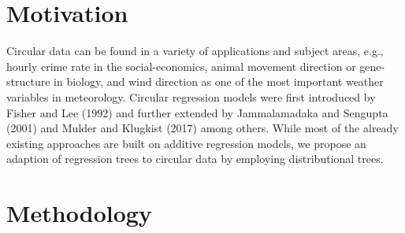 \documentclass[twoside]{report}
\begin{document}


\section{Motivation}

Circular data can be found in a variety of applications and subject areas, 
e.g., hourly crime rate in the social-economics, 
animal movement direction or gene-structure in biology, 
and wind direction as one of the most important weather variables in meteorology.
Circular regression models were first introduced by Fisher and Lee (1992) and 
further extended by Jammalamadaka and Sengupta (2001) and 
Mulder and Klugkist (2017) among others.
While most of the already existing approaches are built on additive regression models, 
we propose an adaption of regression trees to circular data by employing 
distributional trees.


\section{Methodology}
\end{document}
